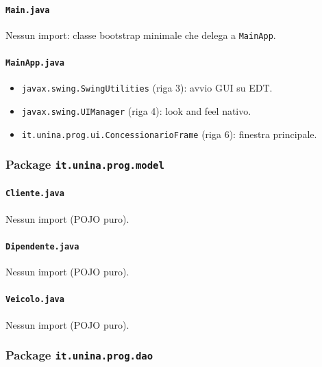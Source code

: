 \documentclass[12pt,a4paper]{article}
\begin{document}
\paragraph{\texttt{Main.java}}
Nessun import: classe bootstrap minimale che delega a \texttt{MainApp}.

\paragraph{\texttt{MainApp.java}}
\begin{itemize}
  \item \texttt{javax.swing.SwingUtilities} (riga 3): avvio GUI su EDT.
  \item \texttt{javax.swing.UIManager} (riga 4): look and feel nativo.
  \item \texttt{it.unina.prog.ui.ConcessionarioFrame} (riga 6): finestra principale.
\end{itemize}

\subsubsection*{Package \texttt{it.unina.prog.model}}
\paragraph{\texttt{Cliente.java}} Nessun import (POJO puro).
\paragraph{\texttt{Dipendente.java}} Nessun import (POJO puro).
\paragraph{\texttt{Veicolo.java}} Nessun import (POJO puro).

\subsubsection*{Package \texttt{it.unina.prog.dao}}
\end{document}
